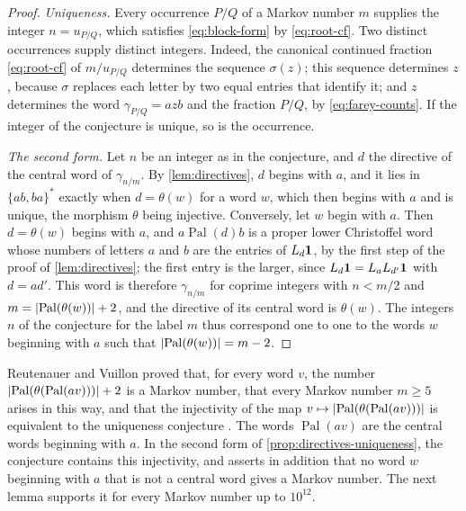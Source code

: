 \begin{proof}
\emph{Uniqueness.} Every occurrence $P/Q$ of a Markov number $m$ supplies the
integer $n=u_{P/Q}$, which satisfies \eqref{eq:block-form} by
\eqref{eq:root-cf}. Two distinct occurrences supply distinct integers. Indeed,
the canonical continued fraction \eqref{eq:root-cf} of $m/u_{P/Q}$ determines
the sequence $\sigma(z)$; this sequence determines $z$, because $\sigma$ replaces
each letter by two equal entries that identify it; and $z$ determines the word
$\gamma_{P/Q}=azb$ and the fraction $P/Q$, by \eqref{eq:farey-counts}. If the
integer of the conjecture is unique, so is the occurrence.

\emph{The second form.} Let $n$ be an integer as in the conjecture, and $d$ the
directive of the central word of $\gamma_{n/m}$. By \cref{lem:directives}, $d$
begins with $a$, and it lies in $\{ab,ba\}^*$ exactly when $d=\theta(w)$ for a
word $w$, which then begins with $a$ and is unique, the morphism $\theta$ being
injective. Conversely, let $w$ begin with $a$. Then $d=\theta(w)$ begins with
$a$, and $a\operatorname{Pal}(d)b$ is a proper lower Christoffel word whose numbers
of letters $a$ and $b$ are the entries of $L_d{\bf1}$, by the first step of the
proof of \cref{lem:directives}; the first entry is the larger, since
$L_d{\bf1}=L_aL_{d'}{\bf1}$ with $d=ad'$. This word is therefore
$\gamma_{n/m}$ for coprime integers with $n<m/2$ and
$m=\lvert\operatorname{Pal}(\theta(w))\rvert+2$, and the directive of its central word is
$\theta(w)$. The integers $n$ of the conjecture for the label $m$ thus
correspond one to one to the words $w$ beginning with $a$ such that
$\lvert\operatorname{Pal}(\theta(w))\rvert=m-2$.
\end{proof}

Reutenauer and Vuillon proved that, for every word $v$, the number
$\lvert\operatorname{Pal}(\theta(\operatorname{Pal}(av)))\rvert+2$ is a Markov number, that every
Markov number $m\geqslant5$ arises in this way, and that the injectivity of the
map $v\mapsto\lvert\operatorname{Pal}(\theta(\operatorname{Pal}(av)))\rvert$ is equivalent to the
uniqueness conjecture \cite[Theorem~1]{ReutenauerVuillon2017}. The words
$\operatorname{Pal}(av)$ are the central words beginning with $a$. In the second
form of \cref{prop:directives-uniqueness}, the conjecture contains this
injectivity, and asserts in addition that no word $w$ beginning with $a$ that
is not a central word gives a Markov number. The next lemma supports it for
every Markov number up to $10^{12}$.


